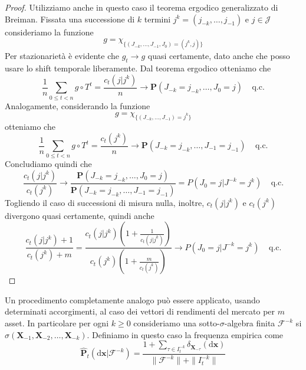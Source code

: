\documentclass[a4paper,11pt]{book}
\theoremstyle{plain}
\theoremstyle{definition}
\theoremstyle{remark}
\newcommand{\dX}{\text{d}\bm{x}}
\newcommand{\X}{\bm{X}}
\newcommand{\F}{\mathcal{F}}
\newcommand{\Pro}{\mathbf{P}}
\newcommand{\Ph}{\hat{\mathbf{P}}}
\begin{document}
\begin{proof}
	Utilizziamo anche in questo caso il teorema ergodico generalizzato di Breiman.\newline
	Fissata una successione di $k$ termini $j^k = (j_{-k},\ldots, j_{-1})$ e $j\in\mathcal{J}$ consideriamo la funzione
	\begin{equation*}
		g = \chi_{\{(J_{-k},\ldots, J_{-1},J_{0})=(j^k,j)\}}
	\end{equation*}
	Per stazionarietà è evidente che $\hat{g}_t\rightarrow g$ quasi certamente, dato anche che posso usare lo shift temporale liberamente.\newline
	Dal teorema ergodico otteniamo che
	\begin{equation*}
		\frac{1}{n}\sum_{0\leq t <n}g\circ T^t = \frac{c_t(j|j^k)}{n} \rightarrow \Pro(J_{-k}=j_{-k},\ldots, J_{0}=j)\;\;\;\; \text{q.c.}
	\end{equation*}
	Analogamente, considerando la funzione
	\begin{equation*}
	g = \chi_{\{(J_{-k},\ldots, J_{-1})=j^k\}}
	\end{equation*}
	otteniamo che
	\begin{equation*}
	\frac{1}{n}\sum_{0\leq t <n}g\circ T^t = \frac{c_t(j^k)}{n} \rightarrow \Pro(J_{-k}=j_{-k},\ldots, J_{-1}=j_{-1})\;\;\;\; \text{q.c.}
	\end{equation*}
	Concludiamo quindi che
	\begin{equation*}
		\frac{c_t(j|j^k)}{c_t(j^k)}\rightarrow \frac{\Pro(J_{-k}=j_{-k},\ldots, J_{0}=j)}{\Pro(J_{-k}=j_{-k},\ldots, J_{-1}=j_{-1})}=P(J_0 = j|J^{-k}=j^k)\;\;\;\; \text{q.c.}
	\end{equation*}
	Togliendo il caso di successioni di misura nulla, inoltre, $c_t(j|j^k)$ e $c_t(j^k)$ divergono quasi certamente, quindi anche
	\begin{equation*}
	\frac{c_t(j|j^k)+1}{c_t(j^k)+m}= \frac{c_t(j|j^k)\left(1+\frac{1}{c_t(j|j^k)}\right)}{c_t(j^k)\left(1+\frac{m}{c_t(j^k)}\right)}\rightarrow P(J_0 = j|J^{-k}=j^k)\;\;\;\; \text{q.c.}
	\end{equation*}
\end{proof}
Un procedimento completamente analogo può essere applicato, usando determinati accorgimenti, al caso dei vettori di rendimenti del mercato per $m$ asset. In particolare per ogni $k\geq 0$ consideriamo una sotto-$\sigma$-algebra finita $\F^{-k}$ si $\sigma(\X_{-1},\X_{-2},\ldots,\X_{-k})$. Definiamo in questo caso la frequenza empirica come
\begin{equation*}
	\Ph_t(\dX|\F^{-k})=\frac{1+\sum_{\tau \in I^{-k}_t}{\delta_{\X_{-\tau}}(\dX)}}{\|\F^{-k}\|+\|I^{-k}_t\|}
\end{equation*}
\end{document}
